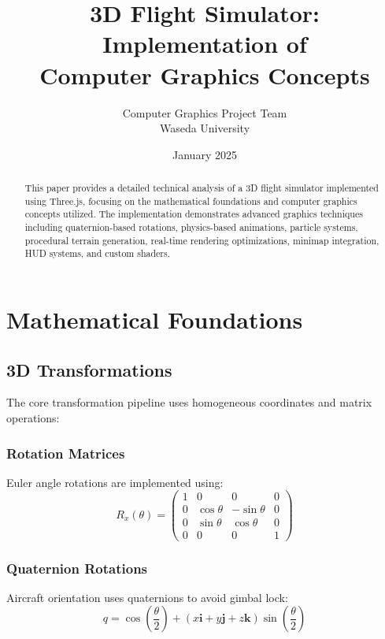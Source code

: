 \documentclass{article}
\title{3D Flight Simulator: Implementation of \\
Computer Graphics Concepts}
\author{Computer Graphics Project Team\\\small{Waseda University}}
\date{January 2025}
\begin{document}
\maketitle

\begin{abstract}
This paper provides a detailed technical analysis of a 3D flight simulator implemented using Three.js, focusing on the mathematical foundations and computer graphics concepts utilized. The implementation demonstrates advanced graphics techniques including quaternion-based rotations, physics-based animations, particle systems, procedural terrain generation, real-time rendering optimizations, minimap integration, HUD systems, and custom shaders.
\end{abstract}

\section{Mathematical Foundations}

\subsection{3D Transformations}
The core transformation pipeline uses homogeneous coordinates and matrix operations:

\subsubsection{Rotation Matrices}
Euler angle rotations are implemented using:
\begin{equation}
R_x(\theta) = \begin{pmatrix}
1 & 0 & 0 & 0 \\
0 & \cos\theta & -\sin\theta & 0 \\
0 & \sin\theta & \cos\theta & 0 \\
0 & 0 & 0 & 1
\end{pmatrix}
\end{equation}

\subsubsection{Quaternion Rotations}
Aircraft orientation uses quaternions to avoid gimbal lock:
\begin{equation}
q = \cos\left(\frac{\theta}{2}\right) + (x\mathbf{i} + y\mathbf{j} + z\mathbf{k})\sin\left(\frac{\theta}{2}\right)
\end{equation}
\end{document}
